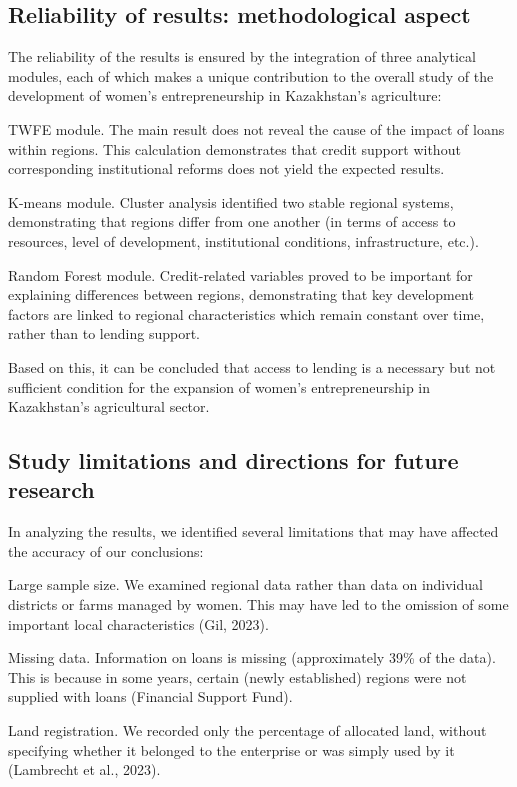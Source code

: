 ﻿\documentclass[sn-mathphys-num]{sn-jnl}
\newcommand{\hl}[1]{#1}
\begin{document}
\subsection{Reliability of results: methodological aspect}

The reliability of the results is ensured by the integration of three
analytical modules, each of which makes a unique contribution to the
overall study of the development of women's entrepreneurship in
Kazakhstan's agriculture:

TWFE module. The main result does not reveal the cause of the impact of
loans within regions. This calculation demonstrates that credit support
without corresponding institutional reforms does not yield the expected
results.

K-means module. Cluster analysis identified two stable regional systems,
demonstrating that regions differ from one another (in terms of access
to resources, level of development, institutional conditions,
infrastructure, etc.).

Random Forest module. Credit-related variables proved to be important
for explaining differences between regions, demonstrating that key
development factors are linked to regional characteristics which remain
constant over time, rather than to lending support.

Based on this, it can be concluded that access to lending is a necessary
but not sufficient condition for the expansion of women's
entrepreneurship in Kazakhstan's agricultural sector.

\subsection{Study limitations and directions for future research}

In analyzing the results, we identified several limitations that may
have affected the accuracy of our conclusions:

Large sample size. We examined regional data rather than data on
individual districts or farms managed by women. This may have led to the
omission of some important local characteristics \hl{(Gil, 2023).}

Missing data. Information on loans is missing (approximately 39\% of the
data). This is because in some years, certain (newly established)
regions were not supplied with loans (Financial Support Fund).

Land registration. We recorded only the percentage of allocated land,
without specifying whether it belonged to the enterprise or was simply
used by it \hl{(Lambrecht et al., 2023).}
\end{document}
